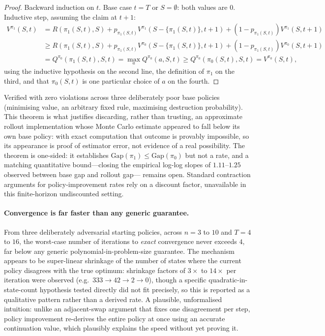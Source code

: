 \begin{proof}
Backward induction on $t$. Base case $t=T$ or $S=\emptyset$: both values are
$0$. Inductive step, assuming the claim at $t+1$:
\begin{align*}
V^{\pi_1}(S,t)
&= R(\pi_1(S,t),S) + p_{\pi_1(S,t)} V^{\pi_1}(S{-}\{\pi_1(S,t)\},t{+}1) + (1-p_{\pi_1(S,t)}) V^{\pi_1}(S,t{+}1) \\
&\ge R(\pi_1(S,t),S) + p_{\pi_1(S,t)} V^{\pi_0}(S{-}\{\pi_1(S,t)\},t{+}1) + (1-p_{\pi_1(S,t)}) V^{\pi_0}(S,t{+}1) \\
&= Q^{\pi_0}(\pi_1(S,t), S, t) = \max_a Q^{\pi_0}(a,S,t) \ge Q^{\pi_0}(\pi_0(S,t),S,t) = V^{\pi_0}(S,t),
\end{align*}
using the inductive hypothesis on the second line, the definition of $\pi_1$ on
the third, and that $\pi_0(S,t)$ is one particular choice of $a$ on the fourth.
\end{proof}

Verified with zero violations across three deliberately poor base policies
(minimising value, an arbitrary fixed rule, maximising destruction probability).
This theorem is what justifies discarding, rather than trusting, an approximate
rollout implementation whose Monte Carlo estimate appeared to fall below its own
base policy: with exact computation that outcome is provably impossible, so its
appearance is proof of estimator error, not evidence of a real possibility. The
theorem is one-sided: it establishes $\mathrm{Gap}(\pi_1) \le \mathrm{Gap}(\pi_0)$
but not a rate, and a matching quantitative bound---closing the empirical
log-log slopes of $1.11$--$1.25$ observed between base gap and rollout gap---
remains open. Standard contraction arguments for policy-improvement rates rely on
a discount factor, unavailable in this finite-horizon undiscounted setting.

\paragraph{Convergence is far faster than any generic guarantee.} From three deliberately
adversarial starting policies, across $n=3$ to $10$ and $T=4$ to $16$, the
worst-case number of iterations to \emph{exact} convergence never exceeds $4$,
far below any generic polynomial-in-problem-size guarantee. The mechanism
appears to be super-linear shrinkage of the number of states where the
current policy disagrees with the true optimum: shrinkage factors of
$3\times$ to $14\times$ per iteration were observed (e.g.\ $333\to42\to2\to0$),
though a specific quadratic-in-state-count hypothesis tested directly did not
fit precisely, so this is reported as a qualitative pattern rather than a
derived rate. A plausible, unformalised intuition: unlike an adjacent-swap
argument that fixes one disagreement per step, policy improvement re-derives
the entire policy at once using an accurate continuation value, which
plausibly explains the speed without yet proving it.

